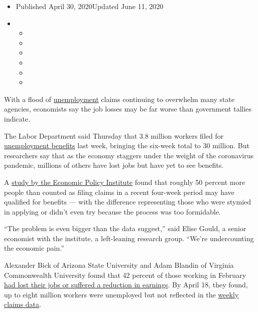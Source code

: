\begin{itemize}
\item
  Published April 30, 2020Updated June 11, 2020
\item
  \begin{itemize}
  \item
  \item
  \item
  \item
  \item
  \item
  \end{itemize}
\end{itemize}

With a flood of
\href{https://www.nytimes3xbfgragh.onion/2020/05/21/business/economy/coronavirus-unemployment-claims.html}{unemployment}
claims continuing to overwhelm many state agencies, economists say the
job losses may be far worse than government tallies indicate.

The Labor Department said Thursday that 3.8 million workers filed for
\href{https://www.nytimes3xbfgragh.onion/2020/06/11/us/politics/unemployment-benefits-coronavirus.html}{unemployment
benefits} last week, bringing the six-week total to 30 million. But
researchers say that as the economy staggers under the weight of the
coronavirus pandemic, millions of others have lost jobs but have yet to
see benefits.

A
\href{https://www.epi.org/blog/unemployment-filing-failures-new-survey-confirms-that-millions-of-jobless-were-unable-to-file-an-unemployment-insurance-claim/}{study
by the Economic Policy Institute} found that roughly 50 percent more
people than counted as filing claims in a recent four-week period may
have qualified for benefits --- with the difference representing those
who were stymied in applying or didn't even try because the process was
too formidable.

``The problem is even bigger than the data suggest,'' said Elise Gould,
a senior economist with the institute, a left-leaning research group.
``We're undercounting the economic pain.''

Alexander Bick of Arizona State University and Adam Blandin of Virginia
Commonwealth University found that 42 percent of those working in
February
\href{https://alexbick.weebly.com/uploads/1/0/1/3/101306056/bb_covid.pdf}{had
lost their jobs or suffered a reduction in earnings}. By April 18, they
found, up to eight million workers were unemployed but not reflected in
the
\href{https://www.nytimes3xbfgragh.onion/2020/06/04/business/economy/coronavirus-unemployment-claims.html}{weekly
claims data}.

